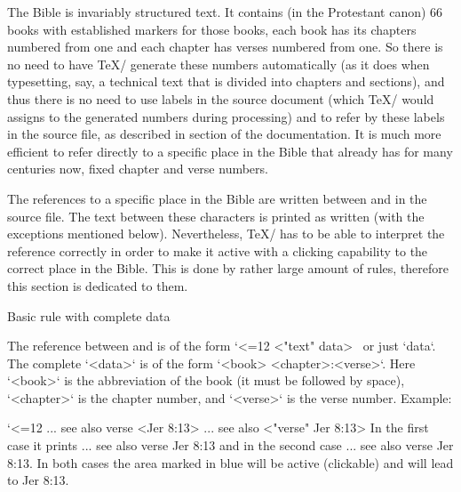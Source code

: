 The Bible is invariably
structured text. It contains (in the Protestant canon) 66 books with established markers for those books,
each book has its chapters numbered from one and each chapter has verses
numbered from one. So there is no need to have \TeX/ generate these numbers
automatically (as it does when typesetting, say, a technical text that is divided into
chapters and sections), and thus there is no need to use labels in the source
document (which \TeX/ would assigns to the generated numbers during processing) and to refer by these labels in the source file, 
as described in section  of the 
 documentation. 
It is much more efficient to refer directly to a specific place in the Bible that already has
for many centuries now,  fixed chapter and verse numbers.


 
 
The references to a specific place in the Bible are written between \code{<} and \code{>} in the source file.
The text between these characters is printed as written (with the exceptions mentioned below). 
Nevertheless, \TeX/ has to be able to interpret the reference correctly in order to
make it active with a clicking capability to the correct place in the Bible. This is done by
rather large amount of rules, therefore this section is dedicated to them.


\secc[uudaj] Basic rule with complete data

The reference between \code{<} and \code{>} is of the form 
\begtt\catcode`<=12
<"text" data>
\endtt
\ or just \code{<}`data`\code{>}. 
The complete `<data>` is of the form `<book> <chapter>:<verse>`. Here `<book>` is the abbreviation of the book (it must be followed by
space), `<chapter>` is the chapter number, and `<verse>` is the verse number.
Example:

\begtt \catcode`<=12
... see also verse <Jer 8:13>
... see also <"verse" Jer 8:13>
\endtt
In the first case it prints ... see also verse {\Blue Jer 8:13} and in the second case
... see also {\Blue verse Jer 8:13}. 
In both cases the area marked in blue will be active (clickable) and will lead to Jer 8:13.


